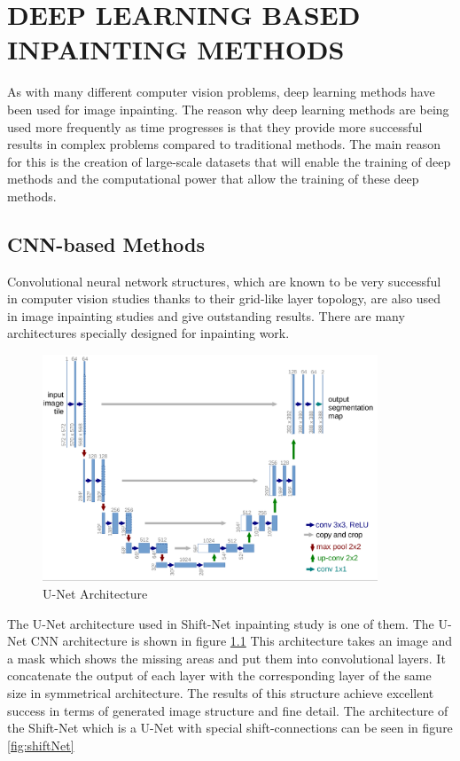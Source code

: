 \chapter{DEEP LEARNING BASED INPAINTING METHODS}\label{deep_methods}

As with many different computer vision problems, deep learning methods have been used for image inpainting. The reason why deep learning methods are being used more frequently as time progresses is that they provide more successful results in complex problems compared to traditional methods. The main reason for this is the creation of large-scale datasets that will enable the training of deep methods and the computational power that allow the training of these deep methods.

\section{CNN-based Methods}

Convolutional neural network structures, which are known to be very successful in computer vision studies thanks to their grid-like layer topology, are also used in image inpainting studies and give outstanding results. There are many architectures specially designed for inpainting work.

\begin{figure}[h!]
    \centering
    \includegraphics[width=10cm]{figures/chapter4/unet.png}
    \vspace*{5mm}
    \caption{U-Net Architecture \cite{unet}}
    \label{fig:u-net}
\end{figure}

The U-Net \cite{unet} architecture used in Shift-Net inpainting study \cite{shiftNet} is one of them. The U-Net CNN architecture is shown in figure \ref{fig:u-net}  This architecture takes an image and a mask which shows the missing areas and put them into convolutional layers. It concatenate the output of each layer with the corresponding layer of the same size in symmetrical architecture. The results of this structure achieve excellent success in terms of generated image structure and fine detail. The architecture of the Shift-Net which is a U-Net with special shift-connections can be seen in figure \ref{fig:shiftNet}

